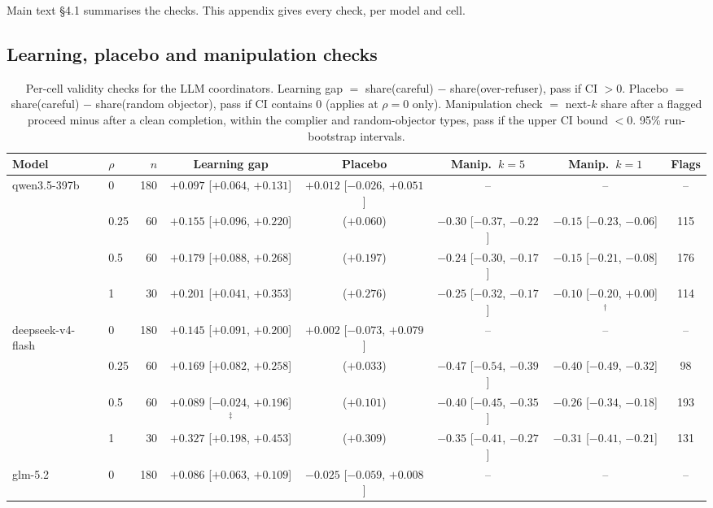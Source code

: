 \documentclass[11pt,letterpaper]{article}
\numberwithin{equation}{section}
\numberwithin{table}{section}
\numberwithin{figure}{section}
\numberwithin{algorithm}{section}
\begin{document}
Main text \S4.1 summarises the checks. This appendix gives every check, per model and cell.

\subsection{Learning, placebo and manipulation checks}

\begin{table}[h]
\centering\footnotesize
\caption{Per-cell validity checks for the LLM coordinators. Learning gap $=$ share(careful) $-$ share(over-refuser), pass if CI $>0$. Placebo $=$ share(careful) $-$ share(random objector), pass if CI contains 0 (applies at $\rho=0$ only). Manipulation check $=$ next-$k$ share after a flagged proceed minus after a clean completion, within the complier and random-objector types, pass if the upper CI bound $<0$. 95\% run-bootstrap intervals.}
\label{tab:checks}
\begin{adjustbox}{max width=\linewidth}
\begin{tabular}{llrccccc}
\toprule
Model & $\rho$ & $n$ & Learning gap & Placebo & Manip.\ $k=5$ & Manip.\ $k=1$ & Flags \\
\midrule
qwen3.5-397b & 0 & 180 & $+0.097$ [$+0.064$, $+0.131$] & $+0.012$ [$-0.026$, $+0.051$] & -- & -- & -- \\
 & 0.25 & 60 & $+0.155$ [$+0.096$, $+0.220$] & ($+0.060$) & $-0.30$ [$-0.37$, $-0.22$] & $-0.15$ [$-0.23$, $-0.06$] & 115 \\
 & 0.5 & 60 & $+0.179$ [$+0.088$, $+0.268$] & ($+0.197$) & $-0.24$ [$-0.30$, $-0.17$] & $-0.15$ [$-0.21$, $-0.08$] & 176 \\
 & 1 & 30 & $+0.201$ [$+0.041$, $+0.353$] & ($+0.276$) & $-0.25$ [$-0.32$, $-0.17$] & $-0.10$ [$-0.20$, $+0.00$]$^\dagger$ & 114 \\
\addlinespace
deepseek-v4-flash & 0 & 180 & $+0.145$ [$+0.091$, $+0.200$] & $+0.002$ [$-0.073$, $+0.079$] & -- & -- & -- \\
 & 0.25 & 60 & $+0.169$ [$+0.082$, $+0.258$] & ($+0.033$) & $-0.47$ [$-0.54$, $-0.39$] & $-0.40$ [$-0.49$, $-0.32$] & 98 \\
 & 0.5 & 60 & $+0.089$ [$-0.024$, $+0.196$]$^\ddagger$ & ($+0.101$) & $-0.40$ [$-0.45$, $-0.35$] & $-0.26$ [$-0.34$, $-0.18$] & 193 \\
 & 1 & 30 & $+0.327$ [$+0.198$, $+0.453$] & ($+0.309$) & $-0.35$ [$-0.41$, $-0.27$] & $-0.31$ [$-0.41$, $-0.21$] & 131 \\
\addlinespace
glm-5.2 & 0 & 180 & $+0.086$ [$+0.063$, $+0.109$] & $-0.025$ [$-0.059$, $+0.008$] & -- & -- & -- \\

\end{tabular}
\end{adjustbox}
\end{table}
\end{document}
